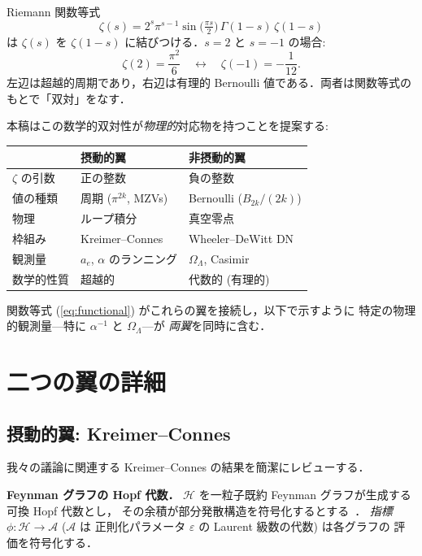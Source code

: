 \documentclass[11pt,a4paper]{article}
\begin{document}
Riemann 関数等式
\begin{equation}\label{eq:functional}
\zeta(s) = 2^s \pi^{s-1}\sin\!\bigl(\tfrac{\pi s}{2}\bigr)
\,\Gamma(1-s)\,\zeta(1-s)
\end{equation}
は $\zeta(s)$ を $\zeta(1-s)$ に結びつける．$s = 2$ と $s = -1$ の場合:
\begin{equation}
\zeta(2) = \frac{\pi^2}{6}\quad \longleftrightarrow \quad
\zeta(-1) = -\frac{1}{12}.
\end{equation}
左辺は超越的周期であり，右辺は有理的 Bernoulli 値である．両者は関数等式の
もとで「双対」をなす．

本稿はこの数学的双対性が\emph{物理的}対応物を持つことを提案する:

\begin{center}
\begin{tabular}{lll}
\toprule
 & \textbf{摂動的翼} & \textbf{非摂動的翼} \\
\midrule
$\zeta$ の引数 & 正の整数 & 負の整数 \\
値の種類 & 周期 ($\pi^{2k}$, MZVs) & Bernoulli ($B_{2k}/(2k)$) \\
物理 & ループ積分 & 真空零点 \\
枠組み & Kreimer--Connes & Wheeler--DeWitt DN \\
観測量 & $a_e$, $\alpha$ のランニング & $\Omega_\Lambda$, Casimir \\
数学的性質 & 超越的 & 代数的 (有理的) \\
\bottomrule
\end{tabular}
\end{center}

関数等式 (\ref{eq:functional}) がこれらの翼を接続し，以下で示すように
特定の物理的観測量---特に $\alpha^{-1}$ と $\Omega_\Lambda$---が
\emph{両翼}を同時に含む．

\section{二つの翼の詳細}

\subsection{摂動的翼: Kreimer--Connes}

我々の議論に関連する Kreimer--Connes の結果を簡潔にレビューする．

\textbf{Feynman グラフの Hopf 代数．}
$\mathcal{H}$ を一粒子既約 Feynman グラフが生成する可換 Hopf 代数とし，
その余積が部分発散構造を符号化するとする~\cite{Kreimer1998}．
\emph{指標} $\phi: \mathcal{H} \to \mathcal{A}$ ($\mathcal{A}$ は
正則化パラメータ $\varepsilon$ の Laurent 級数の代数) は各グラフの
評価を符号化する．
\end{document}
